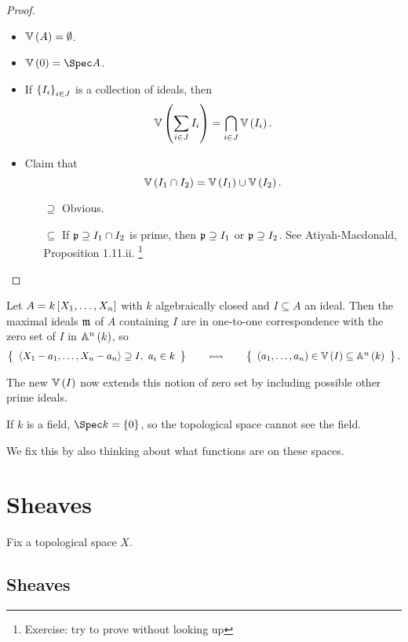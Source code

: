 \begin{proof}
\hfill
\begin{itemize}
\item $ \VV\br{A} = \emptyset $.
\item $ \VV\br{0} = \Spec A $.
\item If $ \cbr{I_i}_{i \in J} $ is a collection of ideals, then
$$ \VV\br{\sum_{i \in J} I_i} = \bigcap_{i \in J} \VV\br{I_i}. $$
\item Claim that
$$ \VV\br{I_1 \cap I_2} = \VV\br{I_1} \cup \VV\br{I_2}. $$
\begin{itemize}
\item[$ \supseteq $] Obvious.
\item[$ \subseteq $] If $ \mathfrak{p} \supseteq I_1 \cap I_2 $ is prime, then $ \mathfrak{p} \supseteq I_1 $ or $ \mathfrak{p} \supseteq I_2 $. See Atiyah-Macdonald, Proposition 1.11.ii. \footnote{Exercise: try to prove without looking up}
\end{itemize}
\end{itemize}
\end{proof}

\begin{example*}
Let $ A = k\sbr{X_1, \dots, X_n} $ with $ k $ algebraically closed and $ I \subseteq A $ an ideal. Then the maximal ideals $ \mathfrak{m} $ of $ A $ containing $ I $ are in one-to-one correspondence with the zero set of $ I $ in $ \AA^n\br{k} $, so
$$ \correspondence{\abr{X_1 - a_1, \dots, X_n - a_n} \supseteq I, \ a_i \in k}{\br{a_1, \dots, a_n} \in \VV\br{I} \subseteq \AA^n\br{k}}. $$
\end{example*}

The new $ \VV\br{I} $ now extends this notion of zero set by including possible other prime ideals.

\begin{example*}
If $ k $ is a field, $ \Spec k = \cbr{0} $, so the topological space cannot see the field.
\end{example*}

We fix this by also thinking about what functions are on these spaces.

\pagebreak

\section{Sheaves}

Fix a topological space $ X $.

\subsection{Sheaves}

